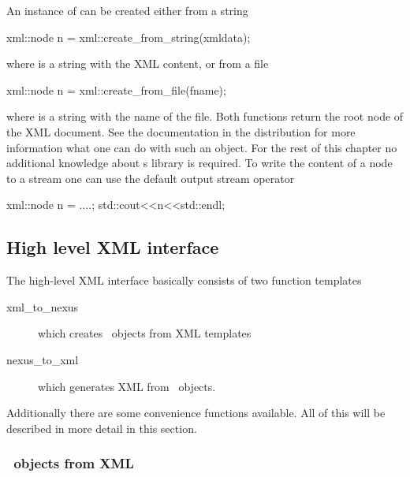 An instance of  can be created either from a string
\begin{cppcode}
    xml::node n = xml::create_from_string(xmldata);
\end{cppcode}
where  is a string with the XML content, 
or from a file
\begin{cppcode}
    xml::node n = xml::create_from_file(fname);
\end{cppcode}
where  is a string with the name of the file. Both functions 
return the root node of the XML document. See the 
documentation in the  distribution for more information what one can
do with such an object. For the rest of this chapter no additional knowledge
about s  library is required.
To write the content of a node to a stream one can use the default 
output stream operator
\begin{cppcode}
    xml::node n = ....;
    std::cout<<n<<std::endl;
\end{cppcode}


\subsection{High level XML interface}\label{sec:xml:highlevel}

The high-level XML interface basically consists of two function templates 
\begin{description}
\item[xml\_to\_nexus] which creates \nexus\ objects from XML templates
\item[nexus\_to\_xml] which generates XML from \nexus\ objects.
\end{description}
Additionally there are some convenience functions available. All of this will 
be described in more detail in this section.

\subsubsection{\nexus\ objects from XML}\label{sec:xml::nxtoxml}

